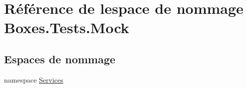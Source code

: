 \hypertarget{namespace_boxes_1_1_tests_1_1_mock}{}\section{Référence de l\textquotesingle{}espace de nommage Boxes.\+Tests.\+Mock}
\label{namespace_boxes_1_1_tests_1_1_mock}
\subsection*{Espaces de nommage}
\begin{DoxyCompactItemize}
\item 
namespace \hyperlink{namespace_boxes_1_1_tests_1_1_mock_1_1_services}{Services}
\end{DoxyCompactItemize}
